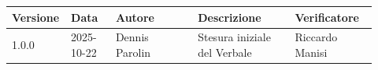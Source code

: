 \documentclass[a4paper,12pt]{article}
\begin{document}
\begin{center}
\small
\renewcommand{\arraystretch}{1.2} 
\begin{tabular}{|p{0.1\linewidth}|p{0.12\linewidth}|p{0.22\linewidth}|p{0.26\linewidth}|p{0.22\linewidth}|}
\hline
\rowcolor{gray!60} 
\textbf{Versione} & \textbf{Data} & \textbf{Autore} & \textbf{Descrizione} & \textbf{Verificatore} \\
\hline
\rowcolor{white}
1.0.0 & 2025-10-22 & Dennis Parolin & Stesura iniziale del Verbale & Riccardo Manisi \\
\hline
\end{tabular}
\end{center}
\end{document}

